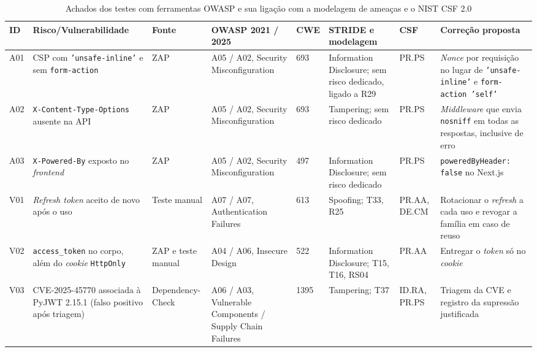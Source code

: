 \documentclass[conference]{IEEEtran}
\begin{document}
\begin{table}[!t]
\centering
\caption{Achados dos testes com ferramentas OWASP e sua ligação com a modelagem de ameaças e o NIST CSF 2.0}
\label{tab:owasp-resultados}
\footnotesize
\renewcommand{\arraystretch}{1.15}
\setlength{\tabcolsep}{4pt}
\begin{tabularx}{\textwidth}{@{}l >{\raggedright\arraybackslash}p{2.7cm} >{\raggedright\arraybackslash}p{1.5cm} >{\raggedright\arraybackslash}p{2.5cm} l >{\raggedright\arraybackslash}p{2.2cm} >{\raggedright\arraybackslash}p{1.2cm} Y@{}}
\hline
\textbf{ID} & \textbf{Risco/Vulnerabilidade} & \textbf{Fonte} & \textbf{OWASP 2021 / 2025} & \textbf{CWE} & \textbf{STRIDE e modelagem} & \textbf{CSF} & \textbf{Correção proposta} \\
\hline
A01 & CSP com \texttt{'unsafe-inline'} e sem \texttt{form-action} & ZAP & A05 / A02, Security Misconfiguration & 693 & Information Disclosure; sem risco dedicado, ligado a R29 & PR.PS & \textit{Nonce} por requisição no lugar de \texttt{'unsafe-inline'} e \texttt{form-action 'self'} \\
A02 & \texttt{X-Content-}\allowbreak\texttt{Type-Options} ausente na API & ZAP & A05 / A02, Security Misconfiguration & 693 & Tampering; sem risco dedicado & PR.PS & \textit{Middleware} que envia \texttt{nosniff} em todas as respostas, inclusive de erro \\
A03 & \texttt{X-Powered-By} exposto no \textit{frontend} & ZAP & A05 / A02, Security Misconfiguration & 497 & Information Disclosure; sem risco dedicado & PR.PS & \texttt{poweredByHeader: false} no Next.js \\
V01 & \textit{Refresh token} aceito de novo após o uso & Teste manual & A07 / A07, Authentication Failures & 613 & Spoofing; T33, R25 & PR.AA, DE.CM & Rotacionar o \textit{refresh} a cada uso e revogar a família em caso de reuso \\
V02 & \texttt{access\_token} no corpo, além do \textit{cookie} \texttt{HttpOnly} & ZAP e teste manual & A04 / A06, Insecure Design & 522 & Information Disclosure; T15, T16, RS04 & PR.AA & Entregar o \textit{token} só no \textit{cookie} \\
V03 & CVE-2025-45770 associada à PyJWT 2.15.1 (falso positivo após triagem) & Depen\-dency-Check & A06 / A03, Vulnerable Components / Supply Chain Failures & 1395 & Tampering; T37 & ID.RA, PR.PS & Triagem da CVE e registro da supressão justificada \\
\hline
\end{tabularx}
\end{table}
\end{document}
